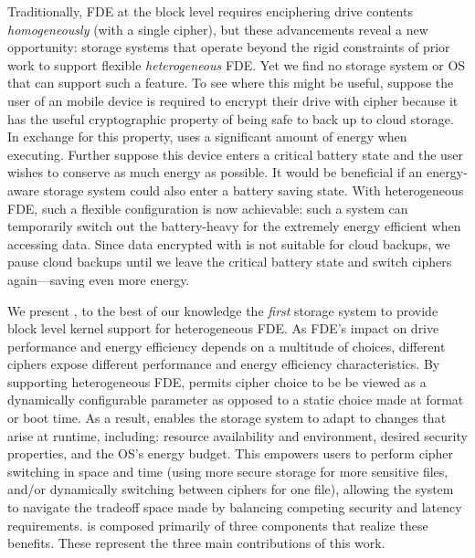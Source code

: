 Traditionally, FDE at the block level requires enciphering drive contents {\em
homogeneously} (with a single cipher), but these advancements reveal a new
opportunity: storage systems that operate beyond the rigid constraints of prior
work to support flexible {\em heterogeneous} FDE. Yet we find no storage system
or OS that can support such a feature. To see where this might be useful,
suppose the user of an mobile device is required to encrypt their drive with
cipher \encA because it has the useful cryptographic property of being safe to
back up to cloud storage. In exchange for this property, \encA uses a
significant amount of energy when executing. Further suppose this device enters
a critical battery state and the user wishes to conserve as much energy as
possible. It would be beneficial if an energy-aware storage system could also
enter a battery saving state. With heterogeneous FDE, such a flexible
configuration is now achievable: such a system can temporarily switch out the
battery-heavy \encA for the extremely energy efficient \encB when accessing
data. Since data encrypted with \encB is not suitable for cloud backups, we
pause cloud backups until we leave the critical battery state and switch ciphers
again---saving even more energy.


We present \sys, to the best of our knowledge the {\em first} storage system to
provide block level kernel support for heterogeneous FDE. As FDE's impact on
drive performance and energy efficiency depends on a multitude of choices,
different ciphers expose different performance and energy efficiency
characteristics. By supporting heterogeneous FDE, \sys permits cipher choice to
be be viewed as a dynamically configurable parameter as opposed to a static
choice made at format or boot time. As a result, \sys enables the storage system
to adapt to changes that arise at runtime, including: resource availability and
environment, desired security properties, and the OS's energy budget. This
empowers users to perform cipher switching in space and time (\eg using more
secure storage for more sensitive files, and/or dynamically switching between
ciphers for one file), allowing the system to navigate the tradeoff space made
by balancing competing security and latency requirements.  \sys is composed
primarily of three components that realize these benefits. These represent the
three main contributions of this work.

